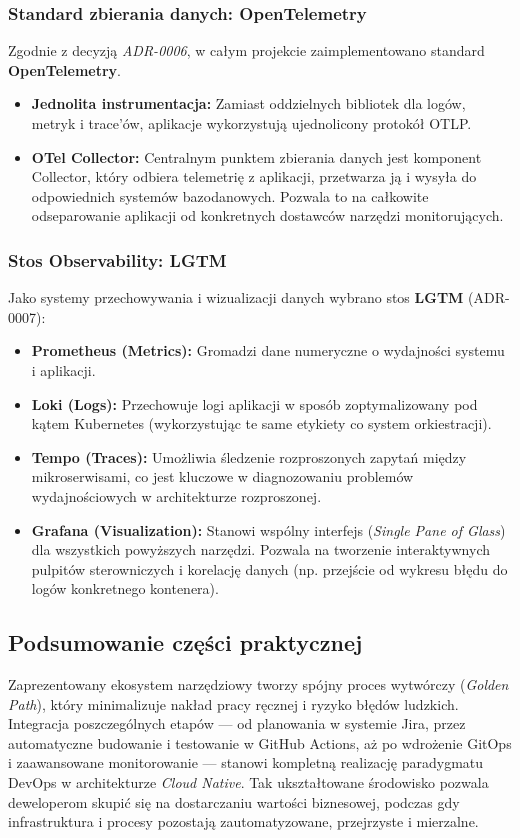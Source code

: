 \subsubsection{Standard zbierania danych: OpenTelemetry}
Zgodnie z decyzją \textit{ADR-0006}, w całym projekcie zaimplementowano standard \textbf{OpenTelemetry}.
\begin{itemize}
    \item \textbf{Jednolita instrumentacja:} Zamiast oddzielnych bibliotek dla logów, metryk i trace'ów, aplikacje wykorzystują ujednolicony protokół OTLP.
    \item \textbf{OTel Collector:} Centralnym punktem zbierania danych jest komponent Collector, który odbiera telemetrię z aplikacji, przetwarza ją i wysyła do odpowiednich systemów bazodanowych. Pozwala to na całkowite odseparowanie aplikacji od konkretnych dostawców narzędzi monitorujących.
\end{itemize}

\subsubsection{Stos Observability: LGTM}
Jako systemy przechowywania i wizualizacji danych wybrano stos \textbf{LGTM} (ADR-0007):
\begin{itemize}
    \item \textbf{Prometheus (Metrics):} Gromadzi dane numeryczne o wydajności systemu i aplikacji.
    \item \textbf{Loki (Logs):} Przechowuje logi aplikacji w sposób zoptymalizowany pod kątem Kubernetes (wykorzystując te same etykiety co system orkiestracji).
    \item \textbf{Tempo (Traces):} Umożliwia śledzenie rozproszonych zapytań między mikroserwisami, co jest kluczowe w diagnozowaniu problemów wydajnościowych w architekturze rozproszonej.
    \item \textbf{Grafana (Visualization):} Stanowi wspólny interfejs (\textit{Single Pane of Glass}) dla wszystkich powyższych narzędzi. Pozwala na tworzenie interaktywnych pulpitów sterowniczych i korelację danych (np. przejście od wykresu błędu do logów konkretnego kontenera).
\end{itemize}

\subsection{Podsumowanie części praktycznej}
Zaprezentowany ekosystem narzędziowy tworzy spójny proces wytwórczy (\textit{Golden Path}), który minimalizuje nakład pracy ręcznej i ryzyko błędów ludzkich. Integracja poszczególnych etapów — od planowania w systemie Jira, przez automatyczne budowanie i testowanie w GitHub Actions, aż po wdrożenie GitOps i zaawansowane monitorowanie — stanowi kompletną realizację paradygmatu DevOps w architekturze \textit{Cloud Native}. Tak ukształtowane środowisko pozwala deweloperom skupić się na dostarczaniu wartości biznesowej, podczas gdy infrastruktura i procesy pozostają zautomatyzowane, przejrzyste i mierzalne.